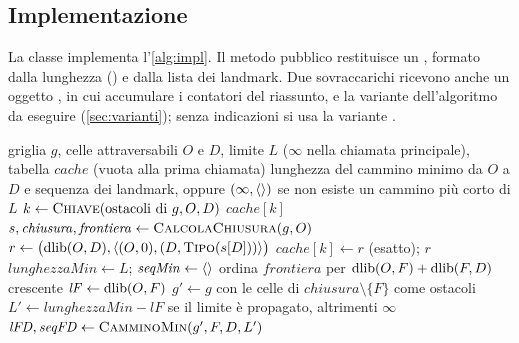 \subsection{Implementazione}
\label{sec:implementazione-cmin}

La classe  implementa l'\cref{alg:impl}. Il metodo
pubblico  restituisce un
, formato dalla lunghezza () e dalla lista
dei landmark. Due sovraccarichi ricevono anche un oggetto
, in cui accumulare i contatori del riassunto, e la
variante dell'algoritmo da eseguire (\cref{sec:varianti}); senza indicazioni
si usa la variante .

\begin{algorithm}[tbp]
\caption{\cmin{} come implementato in }
\label{alg:impl}
\begin{algorithmic}[1]
\Require griglia $g$, celle attraversabili $O$ e $D$, limite $L$ ($\infty$ nella chiamata principale), tabella $\mathit{cache}$ (vuota alla prima chiamata)
\Ensure lunghezza del cammino minimo da $O$ a $D$ e sequenza dei landmark, oppure $(\infty, \langle  \rangle)$ se non esiste un cammino più corto di $L$
  \State $k \gets \Call{Chiave}{\text{ostacoli di } g, O, D}$ 
    \State \Return $\mathit{cache}[k]$ 
  \EndIf
  \State $s, \mathit{chiusura}, \mathit{frontiera} \gets \Call{CalcolaChiusura}{g, O}$ 
   
    \State $r \gets \bigl(\dlib(O,D), \seq{(O,0), (D, \Call{Tipo}{s[D]})}\bigr)$
    \State $\mathit{cache}[k] \gets r$ (esatto); \quad \Return $r$
  \EndIf
  \State $\mathit{lunghezzaMin} \gets L$; \quad $\mathit{seqMin} \gets \langle  \rangle$
  \State ordina $\mathit{frontiera}$ per $\operatorname{dlib}(O,F) + \operatorname{dlib}(F,D)$ crescente 
    \State $\mathit{lF} \gets \operatorname{dlib}(O,F)$
     \Continue {}
    \EndIf
     \Continue {}
    \EndIf
    \State $g' \gets g$ con le celle di $\mathit{chiusura} \setminus \{F\}$ come ostacoli
    \State $L' \gets \mathit{lunghezzaMin} - \mathit{lF}$ se il limite è propagato, altrimenti $\infty$
    \State $\mathit{lFD}, \mathit{seqFD} \gets \Call{CamminoMin}{g', F, D, L'}$

\end{algorithmic}
\end{algorithm}
